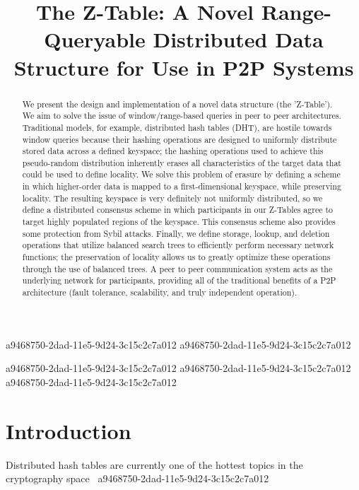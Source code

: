 \documentclass[12pt]{article}
\title{The Z-Table: A Novel Range-Queryable Distributed Data Structure for Use in P2P Systems}
\begin{document}
a9468750-2dad-11e5-9d24-3c15c2c7a012
a9468750-2dad-11e5-9d24-3c15c2c7a012\maketitle

\begin{abstract}
We present the design and implementation of a novel data structure (the 'Z-Table'). We aim to solve the issue of window/range-based queries in peer to peer architectures. Traditional models, for example,  distributed hash tables (DHT), are hostile towards window queries because their hashing operations are designed to uniformly distribute stored data across a defined keyspace; the hashing operations used to achieve this pseudo-random distribution inherently erases all characteristics of the target data that could be used to define locality. We solve this problem of erasure by defining a scheme in which higher-order data is mapped to a first-dimensional keyspace, while preserving locality. The resulting keyspace is very definitely not uniformly distributed, so we define a distributed consensus scheme in which participants in our Z-Tables agree to target highly populated regions of the keyspace. This consensus scheme also provides some protection from Sybil attacks. Finally, we define storage, lookup, and deletion operations that utilize balanced search trees to efficiently perform necessary network functions; the preservation of locality allows us to greatly optimize these operations through the use of balanced trees. A peer to peer communication system acts as the underlying network for participants, providing all of the traditional benefits of a P2P architecture (fault tolerance, scalability, and truly independent operation).
\end{abstract}
a9468750-2dad-11e5-9d24-3c15c2c7a012
a9468750-2dad-11e5-9d24-3c15c2c7a012
a9468750-2dad-11e5-9d24-3c15c2c7a012\newpage
\section{Introduction}
Distributed hash tables are currently one of the hottest topics in the cryptography space~\cite{Stoica:2001dj,Rowstron:2001ea,Ratnasamy:2001wn}
a9468750-2dad-11e5-9d24-3c15c2c7a012
\printbibliography
\end{document}
